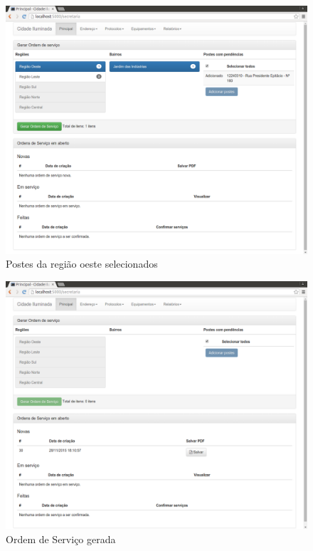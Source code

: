 \documentclass[
	article,			%
	11pt,				%
	oneside,			%
	a4paper,			%
	english,			%
	brazil,				%
	sumario=tradicional
	]{abntex2}
\begin{document}
\begin{figure}[!htbp]
 \centering
 \caption{\label{site-seleciona-poste-ordem-servico}Postes da região oeste selecionados}
 \includegraphics[scale=0.25]{site/9-poste_selecionado.png}
\end{figure}

\begin{figure}[!htbp]
 \centering
 \caption{\label{site-os-gerada}Ordem de Serviço gerada}
 \includegraphics[scale=0.25]{site/11-os_gerada.png}
\end{figure}
\end{document}
